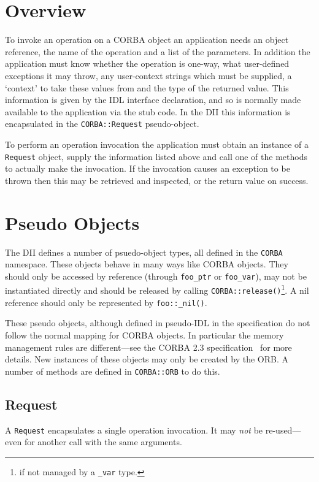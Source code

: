 \documentclass[11pt,twoside,a4paper]{book}
\newcommand{\type}[1]{\texttt{#1}}
\newcommand{\code}[1]{\texttt{#1}}
\newcommand{\op}[1]{\texttt{#1()}}
\begin{document}
\section{Overview}

To invoke an operation on a CORBA object an application needs an
object reference, the name of the operation and a list of the
parameters. In addition the application must know whether the
operation is one-way, what user-defined exceptions it may throw, any
user-context strings which must be supplied, a `context' to take these
values from and the type of the returned value. This information is
given by the IDL interface declaration, and so is normally made
available to the application via the stub code. In the DII this
information is encapsulated in the \type{CORBA::Request}
pseudo-object.

To perform an operation invocation the application must obtain an
instance of a \type{Request} object, supply the information listed
above and call one of the methods to actually make the invocation. If
the invocation causes an exception to be thrown then this may be
retrieved and inspected, or the return value on success.


\section{Pseudo Objects}

The DII defines a number of psuedo-object types, all defined in the
\code{CORBA} namespace. These objects behave in many ways like CORBA
objects. They should only be accessed by reference (through
\type{foo\_ptr} or \type{foo\_var}), may not be instantiated directly
and should be released by calling \op{CORBA::release}\footnote{if not
managed by a \type{\_var} type.}.  A nil reference should only be
represented by \code{foo::\_nil()}.

These pseudo objects, although defined in pseudo-IDL in the
specification do not follow the normal mapping for CORBA objects. In
particular the memory management rules are different---see the CORBA
2.3 specification~\cite{corba23-spec} for more details. New instances
of these objects may only be created by the ORB. A number of methods
are defined in \type{CORBA::ORB} to do this.


\subsection{Request}

A \type{Request} encapsulates a single operation invocation. It may
\emph{not} be re-used---even for another call with the same arguments.
\end{document}
